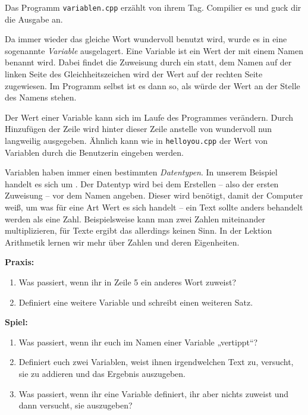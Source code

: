 
Das Programm \texttt{variablen.cpp} erzählt von ihrem Tag.
Compilier es und guck dir die Ausgabe an.


Da immer wieder das gleiche Wort \glqq{}wundervoll\grqq{} benutzt wird, wurde es in eine sogenannte \emph{Variable} ausgelagert.
Eine Variable ist ein Wert der mit einem Namen benannt wird.
Dabei findet die Zuweisung durch ein \cppinline{=} statt, dem Namen auf der linken Seite des Gleichheitszeichen wird der Wert auf der rechten Seite zugewiesen.
Im Programm selbst ist es dann so, als würde der Wert an der Stelle des Namens stehen.

Der Wert einer Variable kann sich im Laufe des Programmes verändern.
Durch Hinzufügen der Zeile  wird hinter dieser Zeile anstelle von \glqq{}wundervoll\grqq{} nun \glqq{}langweilig\grqq{} ausgegeben.
Ähnlich kann wie in \texttt{helloyou.cpp} der Wert von Variablen durch  die Benutzerin eingeben werden.

Variablen haben immer einen bestimmten \emph{Datentypen}.
In unserem Beispiel handelt es sich um .
Der Datentyp wird bei dem Erstellen -- also der ersten Zuweisung -- vor dem Namen angeben.
Dieser wird benötigt, damit der Computer weiß, um was für eine Art Wert es sich handelt -- ein Text sollte anders behandelt werden als eine Zahl.
Beispielsweise kann man zwei Zahlen miteinander multiplizieren, für Texte ergibt das allerdings keinen Sinn.
In der Lektion Arithmetik lernen wir mehr über Zahlen und deren Eigenheiten.

\textbf{Praxis:}
\begin{enumerate}
    \item Was passiert, wenn ihr  in Zeile 5 ein anderes Wort zuweist?
    \item Definiert eine weitere Variable und schreibt einen weiteren Satz.
\end{enumerate}

\textbf{Spiel:}
\begin{enumerate}
    \item Was passiert, wenn ihr euch im Namen einer Variable „vertippt“?
    \item Definiert euch zwei  Variablen, weist ihnen
        irgendwelchen Text zu, versucht, sie zu addieren und das Ergebnis auszugeben.
    \item Was passiert, wenn ihr eine  Variable definiert,
        ihr aber nichts zuweist und dann versucht, sie auszugeben?
\end{enumerate}

